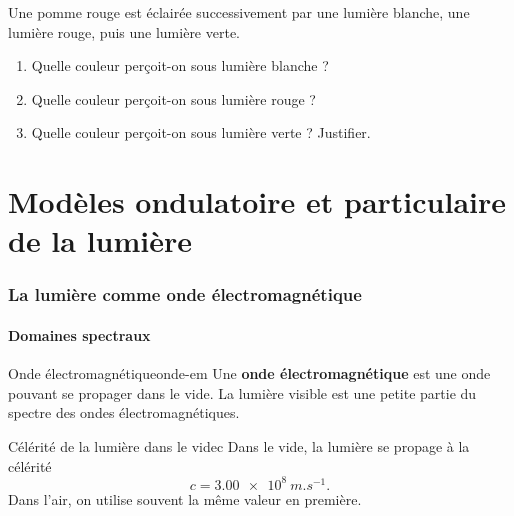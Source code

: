 \documentclass[11pt,a4paper]{article}
\newcounter{exercice}
\newenvironment{exercice}[1][]{%
  \refstepcounter{exercice}%
  \begin{tcolorbox}[colframe=bleuprepa,colback=white,title={Exercice \theexercice\; #1}]%
}{\end{tcolorbox}}
\begin{document}
\begin{exercice}[Couleur d'un objet]
Une pomme rouge est éclairée successivement par une lumière blanche, une lumière rouge, puis une lumière verte.
\begin{enumerate}[label=\alph*)]
  \item Quelle couleur perçoit-on sous lumière blanche ?
  \item Quelle couleur perçoit-on sous lumière rouge ?
  \item Quelle couleur perçoit-on sous lumière verte ? Justifier.
\end{enumerate}
\end{exercice}

\newpage

\part{Modèles ondulatoire et particulaire de la lumière}

\section{La lumière comme onde électromagnétique}

\subsection{Domaines spectraux}

\begin{definitionbox}{Onde électromagnétique}{onde-em}
Une \textbf{onde électromagnétique} est une onde pouvant se propager dans le vide. La lumière visible est une petite partie du spectre des ondes électromagnétiques.
\end{definitionbox}

\begin{retenirbox}{Célérité de la lumière dans le vide}{c}
Dans le vide, la lumière se propage à la célérité
\[
\boxed{c=\SI{3.00e8}{m.s^{-1}}}.
\]
Dans l'air, on utilise souvent la même valeur en première.
\end{retenirbox}

\begin{center}
\end{center}
\end{document}
